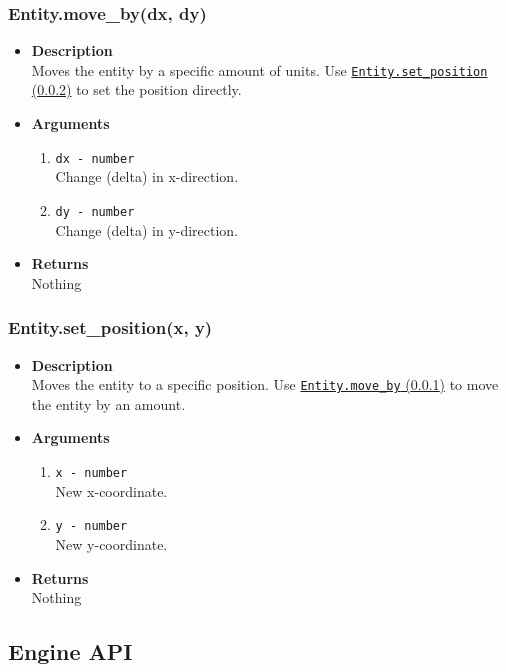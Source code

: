 \documentclass[12pt,a4paper]{article}
\begin{document}
\subsubsection{Entity.move\_by(dx, dy)}\label{EntityMoveBy}
\begin{itemize}
	\item[]{\bf Description}
		\\ Moves the entity by a specific amount of units. Use \hyperref[EntitySetPosition]{\texttt{Entity.set\_position} (\ref{EntitySetPosition})} to set the position directly.
	\item[]{\bf Arguments}
		\begin{enumerate}
			\item{\texttt{dx - number}} 
				\\ Change (delta) in x-direction.
			\item{\texttt{dy - number}} 
				\\ Change (delta) in y-direction.				
		\end{enumerate}
	\item[]{\bf Returns}
		\\ Nothing
\end{itemize}

\subsubsection{Entity.set\_position(x, y)}\label{EntitySetPosition}
\begin{itemize}
	\item[]{\bf Description}
		\\ Moves the entity to a specific position. Use \hyperref[EntityMoveBy]{\texttt{Entity.move\_by} (\ref{EntityMoveBy})} to move the entity by an amount.
	\item[]{\bf Arguments}
		\begin{enumerate}
			\item{\texttt{x - number}} 
				\\ New x-coordinate.
			\item{\texttt{y - number}} 
				\\ New y-coordinate.
		\end{enumerate}
	\item[]{\bf Returns}
		\\ Nothing
\end{itemize}

\subsection{Engine API}
\end{document}
